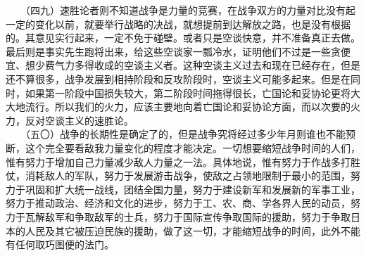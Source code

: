\documentclass[cn,11pt,chinese]{elegantbook}
\begin{document}
　　（四九）速胜论者则不知道战争是力量的竞赛，在战争双方的力量对比没有起一定的变化以前，就要举行战略的决战，就想提前到达解放之路，也是没有根据的。其意见实行起来，一定不免于碰壁。或者只是空谈快意，并不准备真正去做。最后则是事实先生跑将出来，给这些空谈家一瓢冷水，证明他们不过是一些贪便宜、想少费气力多得收成的空谈主义者。这种空谈主义过去和现在已经存在，但是还不算很多，战争发展到相持阶段和反攻阶段时，空谈主义可能多起来。但是在同时，如果第一阶段中国损失较大，第二阶段时间拖得很长，亡国论和妥协论更将大大地流行。所以我们的火力，应该主要地向着亡国论和妥协论方面，而以次要的火力，反对空谈主义的速胜论。\\
　　（五〇）战争的长期性是确定了的，但是战争究将经过多少年月则谁也不能预断，这个完全要看敌我力量变化的程度才能决定。一切想要缩短战争时间的人们，惟有努力于增加自己力量减少敌人力量之一法。具体地说，惟有努力于作战多打胜仗，消耗敌人的军队，努力于发展游击战争，使敌之占领地限制于最小的范围，努力于巩固和扩大统一战线，团结全国力量，努力于建设新军和发展新的军事工业，努力于推动政治、经济和文化的进步，努力于工、农、商、学各界人民的动员，努力于瓦解敌军和争取敌军的士兵，努力于国际宣传争取国际的援助，努力于争取日本的人民及其它被压迫民族的援助，做了这一切，才能缩短战争的时间，此外不能有任何取巧图便的法门。\\
\end{document}
